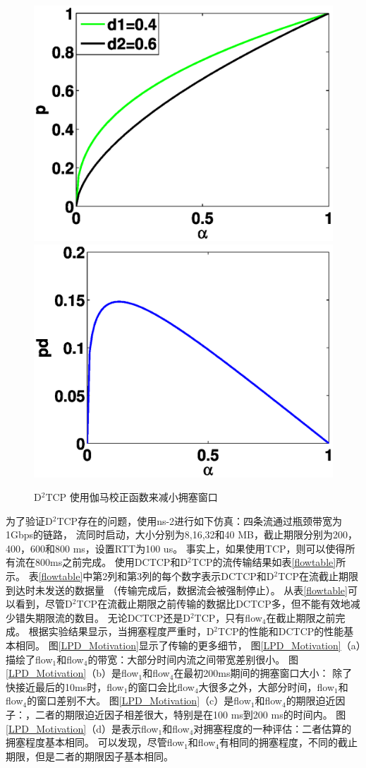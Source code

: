 \begin{figure}[h]
\centering
{}
 {\includegraphics[width=0.45\columnwidth]{figures/LPD/gamma.eps}}
{\includegraphics[width=0.45\columnwidth]{figures/LPD/PD.eps}}
\caption{D$^2$TCP 使用伽马校正函数来减小拥塞窗口}
\label{penalty-fig}
\end{figure}


为了验证D$^2$TCP存在的问题，使用ns-2进行如下仿真：四条流通过瓶颈带宽为1Gbps的链路，
流同时启动，大小分别为8,16,32和40 MB，截止期限分别为200，400，600和800 ms，设置RTT为100 us。
事实上，如果使用TCP，则可以使得所有流在800ms之前完成。
使用DCTCP和D$^2$TCP的流传输结果如表\ref{flowtable}所示。
表\ref{flowtable}中第2列和第3列的每个数字表示DCTCP和D$^2$TCP在流截止期限到达时未发送的数据量
（传输完成后，数据流会被强制停止）。
从表\ref{flowtable}可以看到，尽管D$^2$TCP在流截止期限之前传输的数据比DCTCP多，但不能有效地减少错失期限流的数目。
无论DCTCP还是D$^2$TCP，只有flow$_4$在截止期限之前完成。
根据实验结果显示，当拥塞程度严重时，D$^2$TCP的性能和DCTCP的性能基本相同。 
图\ref{LPD_Motivation}显示了传输的更多细节，
图\ref{LPD_Motivation}（a）描绘了flow$_1$和flow$_4$的带宽：大部分时间内流之间带宽差别很小。
图\ref{LPD_Motivation}（b）是flow$_1$和flow$_4$在最初200ms期间的拥塞窗口大小：
除了快接近最后的10ms时，flow$_1$的窗口会比flow$_4$大很多之外，大部分时间，flow$_1$和flow$_4$的窗口差别不大。
图\ref{LPD_Motivation}（c）是flow$_1$和flow$_4$的期限迫近因子：，二者的期限迫近因子相差很大，特别是在100 ms到200 ms的时间内。
图\ref{LPD_Motivation}（d）是表示flow$_1$和flow$_4$对拥塞程度的一种评估：二者估算的拥塞程度基本相同。
可以发现，尽管flow$_1$和flow$_4$有相同的拥塞程度，不同的截止期限，但是二者的期限因子基本相同。
 
